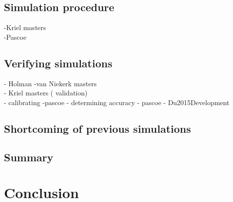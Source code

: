 \subsection{Simulation procedure}
-Kriel masters\\
-Pascoe\\

 \subsection{Verifying simulations}
 - Holman
 -van Niekerk masters\\
 - Kriel masters ( validation)\\
 - calibrating -pascoe
 - determining accuracy - pascoe
 - Du2015Development
 
 \subsection{Shortcoming of previous simulations}
	\subsection{Summary}
\section{Conclusion}